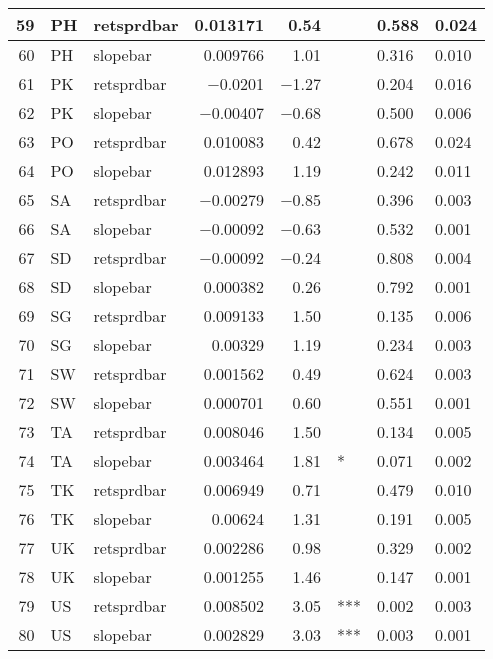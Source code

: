 \begin{longtable}{|r|l|l|r|r|l|l|l|}
   59 &    PH &    retsprdbar &    0.013171 &    0.54 &      &    0.588 &    0.024\\\hline
   60 &    PH &    slopebar &    0.009766 &    1.01 &      &    0.316 &    0.010\\\hline
   61 &    PK &    retsprdbar &    $-$0.0201 &    $-$1.27 &      &    0.204 &    0.016\\\hline
   62 &    PK &    slopebar &    $-$0.00407 &    $-$0.68 &      &    0.500 &    0.006\\\hline
   63 &    PO &    retsprdbar &    0.010083 &    0.42 &      &    0.678 &    0.024\\\hline
   64 &    PO &    slopebar &    0.012893 &    1.19 &      &    0.242 &    0.011\\\hline
   65 &    SA &    retsprdbar &    $-$0.00279 &    $-$0.85 &      &    0.396 &    0.003\\\hline
   66 &    SA &    slopebar &    $-$0.00092 &    $-$0.63 &      &    0.532 &    0.001\\\hline
   67 &    SD &    retsprdbar &    $-$0.00092 &    $-$0.24 &      &    0.808 &    0.004\\\hline
   68 &    SD &    slopebar &    0.000382 &    0.26 &      &    0.792 &    0.001\\\hline
   69 &    SG &    retsprdbar &    0.009133 &    1.50 &      &    0.135 &    0.006\\\hline
   70 &    SG &    slopebar &    0.00329 &    1.19 &      &    0.234 &    0.003\\\hline
   71 &    SW &    retsprdbar &    0.001562 &    0.49 &      &    0.624 &    0.003\\\hline
   72 &    SW &    slopebar &    0.000701 &    0.60 &      &    0.551 &    0.001\\\hline
   73 &    TA &    retsprdbar &    0.008046 &    1.50 &      &    0.134 &    0.005\\\hline
   74 &    TA &    slopebar &    0.003464 &    1.81 &    * &    0.071 &    0.002\\\hline
   75 &    TK &    retsprdbar &    0.006949 &    0.71 &      &    0.479 &    0.010\\\hline
   76 &    TK &    slopebar &    0.00624 &    1.31 &      &    0.191 &    0.005\\\hline
   77 &    UK &    retsprdbar &    0.002286 &    0.98 &      &    0.329 &    0.002\\\hline
   78 &    UK &    slopebar &    0.001255 &    1.46 &      &    0.147 &    0.001\\\hline
   79 &    US &    retsprdbar &    0.008502 &    3.05 &    *** &    0.002 &    0.003\\\hline
   80 &    US &    slopebar &    0.002829 &    3.03 &    *** &    0.003 &    0.001\\\hline
\end{longtable}

